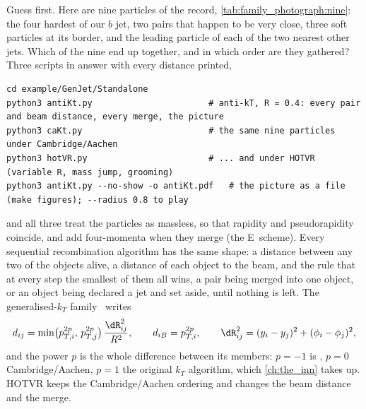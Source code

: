 Guess first. Here are nine particles of the record, \cref{tab:family_photograph:nine}:
the four hardest of our $b$ jet, two pairs that happen to be very close,
three soft particles at its border, and the leading particle of each of
the two nearest other jets. Which of the nine end up together, and in
which order are they gathered? Three scripts in
 answer with every distance printed,
\begin{verbatim}
cd example/GenJet/Standalone
python3 antiKt.py                       # anti-kT, R = 0.4: every pair and beam distance, every merge, the picture
python3 caKt.py                         # the same nine particles under Cambridge/Aachen
python3 hotVR.py                        # ... and under HOTVR (variable R, mass jump, grooming)
python3 antiKt.py --no-show -o antiKt.pdf   # the picture as a file (make figures); --radius 0.8 to play
\end{verbatim}
and all three treat the particles as massless, so that rapidity and
pseudorapidity coincide, and add four-momenta when they merge (the
E~scheme). Every sequential recombination algorithm has the same shape:
a distance \dij between any two of the objects alive, a distance \diB of
each object to the beam, and the rule that at every step the smallest of
them all wins, a pair being merged into one object, or an object being
declared a jet and set aside, until nothing is left. The generalised-$k_T$
family~\cite{Catani:1993hr,Ellis:1993tq,Dokshitzer:1997in,Wobisch:1998wt,Cacciari:2008gp}
writes
\begin{equation}
  \dij=\min\!\big(p_{T,i}^{2p},\,p_{T,j}^{2p}\big)\,\frac{\dR_{ij}^2}{R^2},\qquad
  \diB=p_{T,i}^{2p},\qquad
  \dR_{ij}^2=(y_i-y_j)^2+(\phi_i-\phi_j)^2,
  \label{eq:family_photograph:genkt}
\end{equation}
and the power $p$ is the whole difference between its members: $p=-1$ is
\antikt, $p=0$ Cambridge/Aachen, $p=1$ the original $k_T$ algorithm,
which \cref{ch:the_inn} takes up. HOTVR keeps the Cambridge/Aachen
ordering and changes the beam distance and the merge.

